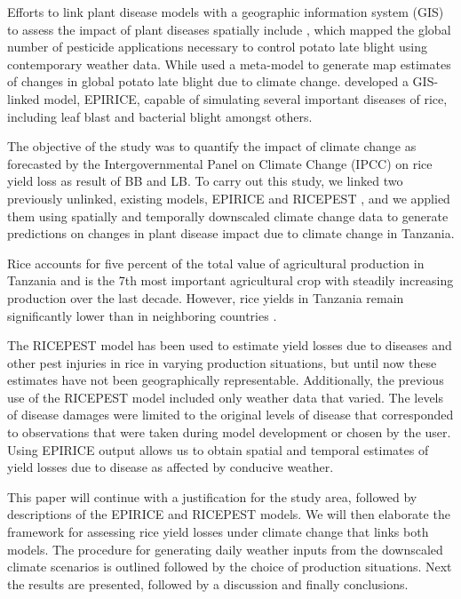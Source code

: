 \documentclass[preprint,12pt]{elsarticle}
\begin{document}
Efforts to link plant disease models with a geographic information system (GIS) to assess the impact of plant diseases spatially include  \citet{Hijmans2000}, which mapped the global number of pesticide applications necessary to control potato late blight using contemporary weather data. While \citet{Sparks2014} used a meta-model to generate map estimates of changes in global potato late blight due to climate change. \citet{Savary2012} developed a GIS-linked model, EPIRICE, capable of simulating several important diseases of rice, including leaf blast and bacterial blight amongst others.

The objective of the study was to quantify the impact of climate change as forecasted by the Intergovernmental Panel on Climate Change (IPCC) on rice yield loss as result of BB and LB. To carry out this study, we linked two previously unlinked, existing models, EPIRICE and RICEPEST \cite{Willocquet2000, Willocquet2002}, and we applied them using spatially and temporally downscaled climate change data to generate predictions on changes in plant disease impact due to climate change in Tanzania.

Rice accounts for five percent of the total value of agricultural production in Tanzania and is the 7th most important agricultural crop with steadily increasing production over the last decade. However, rice yields in Tanzania remain significantly lower than in neighboring countries \cite{Barreiro-Hurle2012}.

The RICEPEST model has been used to estimate yield losses due to diseases and other pest injuries in rice in varying production situations, but until now these estimates have not been geographically representable. Additionally, the previous use of the RICEPEST model included only weather data that varied. The levels of disease damages were limited to the original levels of disease that corresponded to observations that were taken during model development or chosen by the user. Using EPIRICE output allows us to obtain spatial and temporal estimates of yield losses due to disease as affected by conducive weather.

This paper will continue with a justification for the study area, followed by descriptions of the EPIRICE and RICEPEST models. We will then elaborate the framework for assessing rice yield losses under climate change that links both models. The procedure for generating daily weather inputs from the downscaled climate scenarios is outlined followed by the choice of production situations. Next the results are presented, followed by a discussion and finally conclusions.
\end{document}
